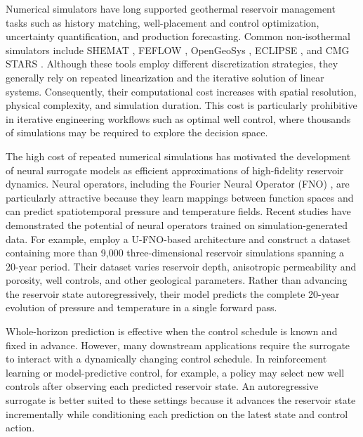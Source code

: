 \documentclass[pdflatex,sn-mathphys-ay]{sn-jnl}
\begin{document}
Numerical simulators have long supported geothermal reservoir management tasks such as
history matching, well-placement and control optimization, uncertainty quantification, and
production forecasting. Common non-isothermal simulators include SHEMAT \citep{shemat},
FEFLOW \citep{feflow}, OpenGeoSys \citep{opengeosys}, ECLIPSE \citep{eclipse}, and CMG STARS
\citep{stars}. Although these tools employ different discretization strategies, they
generally rely on repeated linearization and the iterative solution of linear systems.
Consequently, their computational cost increases with spatial resolution, physical
complexity, and simulation duration. This cost is particularly prohibitive in iterative
engineering workflows such as optimal well control, where thousands of simulations may be
required to explore the decision space.

The high cost of repeated numerical simulations has motivated the development of neural
surrogate models as efficient approximations of high-fidelity reservoir dynamics. Neural
operators, including the Fourier Neural Operator (FNO) \citep{li2021fno}, are particularly
attractive because they learn mappings between function spaces and can predict spatiotemporal
pressure and temperature fields. Recent studies have demonstrated the potential of neural
operators trained on simulation-generated data. For example,
\citet{xueRobustPhysicsconstrainedNeural2026} employ a U-FNO-based architecture and construct
a dataset containing more than 9,000 three-dimensional reservoir simulations spanning a
20-year period. Their dataset varies reservoir depth, anisotropic permeability and porosity,
well controls, and other geological parameters. Rather than advancing the reservoir state
autoregressively, their model predicts the complete 20-year evolution of pressure and
temperature in a single forward pass.

Whole-horizon prediction is effective when the control schedule is known and fixed in
advance. However, many downstream applications require the surrogate to interact with a
dynamically changing control schedule. In reinforcement learning or model-predictive
control, for example, a policy may select new well controls after observing each predicted
reservoir state. An autoregressive surrogate is better suited to these settings because it
advances the reservoir state incrementally while conditioning each prediction on the latest
state and control action.
\end{document}
